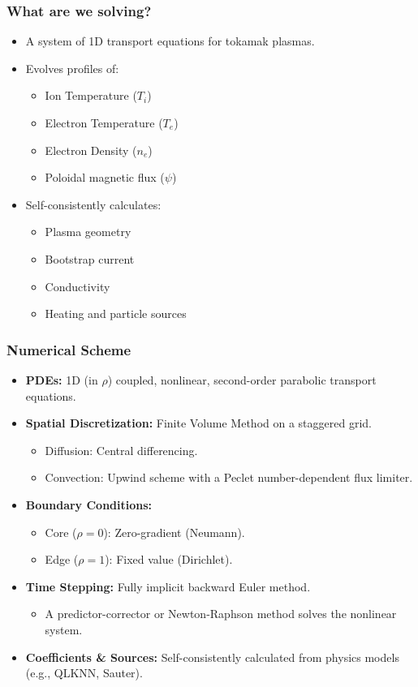 \documentclass[10pt,aspectratio=169]{beamer}
\begin{document}
\begin{frame}
  \frametitle{What are we solving?}
  \begin{itemize}
    \item A system of 1D transport equations for tokamak plasmas.
    \item Evolves profiles of:
    \begin{itemize}
        \item Ion Temperature ($T_i$)
        \item Electron Temperature ($T_e$)
        \item Electron Density ($n_e$)
        \item Poloidal magnetic flux ($\psi$)
    \end{itemize}
    \item Self-consistently calculates:
    \begin{itemize}
        \item Plasma geometry
        \item Bootstrap current
        \item Conductivity
        \item Heating and particle sources
    \end{itemize}
  \end{itemize}
\end{frame}

\begin{frame}
  \frametitle{Numerical Scheme}
  \begin{itemize}
    \item \textbf{PDEs:} 1D (in $\rho$) coupled, nonlinear, second-order parabolic transport equations.
    \item \textbf{Spatial Discretization:} Finite Volume Method on a staggered grid.
    \begin{itemize}
        \item Diffusion: Central differencing.
        \item Convection: Upwind scheme with a Peclet number-dependent flux limiter.
    \end{itemize}
    \item \textbf{Boundary Conditions:}
    \begin{itemize}
        \item Core ($\rho=0$): Zero-gradient (Neumann).
        \item Edge ($\rho=1$): Fixed value (Dirichlet).
    \end{itemize}
    \item \textbf{Time Stepping:} Fully implicit backward Euler method.
    \begin{itemize}
        \item A predictor-corrector or Newton-Raphson method solves the nonlinear system.
    \end{itemize}
    \item \textbf{Coefficients \& Sources:} Self-consistently calculated from physics models (e.g., QLKNN, Sauter).
  \end{itemize}
\end{frame}
\end{document}
